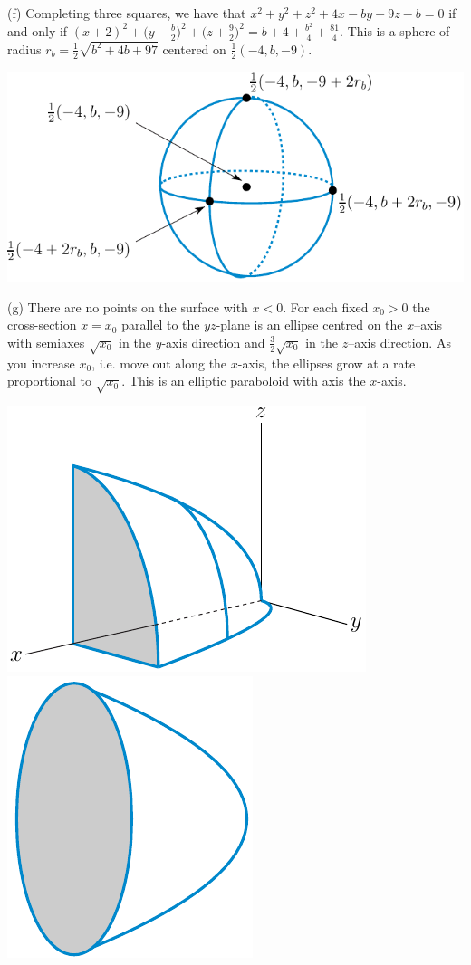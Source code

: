 \begin{solution}
(f) 
Completing three squares, we have that
$x^2+y^2+z^2+4x-by+9z-b=0$ if and only if 
$(x+2)^2+\big(y-\frac{b}{2}\big)^2+\big(z+\frac{9}{2}\big)^2
=b+4+\frac{b^2}{4}+\frac{81}{4}$. 
This is a sphere of radius $r_b=\frac{1}{2}\sqrt{b^2+4b+97}$ centered on 
$\frac{1}{2}(-4,b,-9)$.
\begin{center}
     \includegraphics{fig/shiftSphere.pdf}
\end{center}


(g)
There are no points on the surface with $x<0$.
For each fixed $x_0>0$ the cross-section $x=x_0$ parallel to the
$yz$-plane is an ellipse centred on the $x$--axis with semiaxes $\sqrt{x_0}$ 
in the $y$-axis direction and $\frac{3}{2}\sqrt{x_0}$ in the $z$--axis
direction.  As you increase $x_0$, i.e. move out along the $x$-axis, 
the ellipses grow at a rate proportional to $\sqrt{x_0}$. This is 
an elliptic paraboloid  with axis the $x$-axis.
\begin{center}
     \includegraphics{fig/paraboloidX_l.pdf}\qquad
     \includegraphics[scale=0.8]{fig/paraboloidX_r.pdf}
\end{center}



\end{solution}
